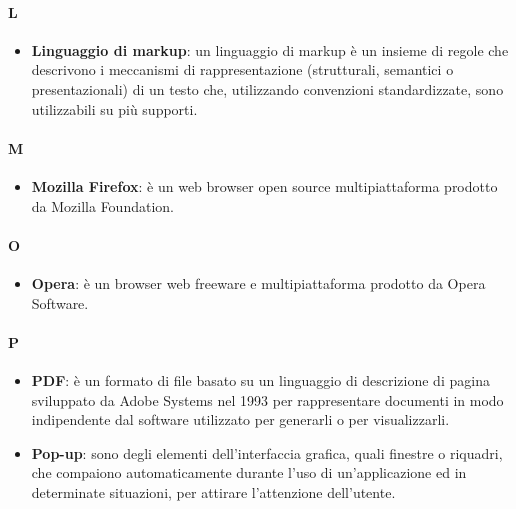 \paragraph{L}
\begin{itemize}
	\item[] \textbf{Linguaggio di markup}: un linguaggio di markup è un insieme di regole che descrivono i meccanismi di rappresentazione (strutturali, semantici o presentazionali) di un testo che, utilizzando convenzioni standardizzate, sono utilizzabili su più supporti.
\end{itemize}
\newpage

\paragraph{M}
\begin{itemize}
	\item[] \textbf{Mozilla Firefox}: è un web browser open source multipiattaforma prodotto da Mozilla Foundation.
\end{itemize}
\newpage

\paragraph{O}
\begin{itemize}
	\item[] \textbf{Opera}: è un browser web freeware e multipiattaforma prodotto da Opera Software.
\end{itemize}
\newpage

\paragraph{P}
\begin{itemize}
	\item[] \textbf{PDF}:  è un formato di file basato su un linguaggio di descrizione di pagina sviluppato da Adobe Systems nel 1993 per rappresentare documenti in modo indipendente dal software utilizzato per generarli o per visualizzarli.
	\item[] \textbf{Pop-up}: sono degli elementi dell'interfaccia grafica, quali finestre o riquadri, che compaiono automaticamente durante l'uso di un'applicazione ed in determinate situazioni, per attirare l'attenzione dell'utente.
\end{itemize}
\newpage

